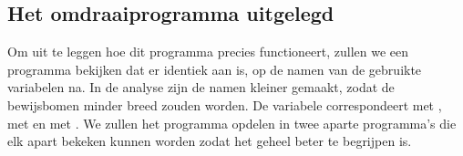 \subsection{Het omdraaiprogramma uitgelegd}
\label{sec:uitleg programma}

Om uit te leggen hoe dit programma precies functioneert, zullen we een
programma bekijken dat er identiek aan is, op de namen van de gebruikte
variabelen na. In de analyse zijn de namen kleiner gemaakt, zodat de
bewijsbomen minder breed zouden worden. De variabele 
correspondeert met ,  met  en
 met . We zullen het programma opdelen in
twee aparte programma's die elk apart bekeken kunnen worden zodat het geheel
beter te begrijpen is.



